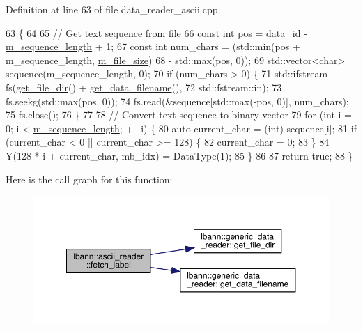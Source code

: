 Definition at line 63 of file data\+\_\+reader\+\_\+ascii.\+cpp.


\begin{DoxyCode}
63                                                                        \{
64 
65   \textcolor{comment}{// Get text sequence from file}
66   \textcolor{keyword}{const} \textcolor{keywordtype}{int} pos = data\_id - \hyperlink{classlbann_1_1ascii__reader_a5788fa7418a086de968929d0d4cb4fa4}{m\_sequence\_length} + 1;
67   \textcolor{keyword}{const} \textcolor{keywordtype}{int} num\_chars = (std::min(pos + m\_sequence\_length, \hyperlink{classlbann_1_1ascii__reader_af684694c8c7faef296bf5af2530471f3}{m\_file\_size})
68                          - std::max(pos, 0));
69   std::vector<char> sequence(m\_sequence\_length, 0);
70   \textcolor{keywordflow}{if} (num\_chars > 0) \{
71     std::ifstream fs(\hyperlink{classlbann_1_1generic__data__reader_ab4c6c2d4ba40ece809ce896828c8ff03}{get\_file\_dir}() + \hyperlink{classlbann_1_1generic__data__reader_a56664e1b43f3fe923cf6d652f14b40a9}{get\_data\_filename}(),
72                      std::fstream::in);
73     fs.seekg(std::max(pos, 0));
74     fs.read(&sequence[std::max(-pos, 0)], num\_chars);
75     fs.close();
76   \}
77 
78   \textcolor{comment}{// Convert text sequence to binary vector}
79   \textcolor{keywordflow}{for} (\textcolor{keywordtype}{int} i = 0; i < \hyperlink{classlbann_1_1ascii__reader_a5788fa7418a086de968929d0d4cb4fa4}{m\_sequence\_length}; ++i) \{
80     \textcolor{keyword}{auto} current\_char = (int) sequence[i];
81     \textcolor{keywordflow}{if} (current\_char < 0 || current\_char >= 128) \{
82       current\_char = 0;
83     \}
84     Y(128 * i + current\_char, mb\_idx) = DataType(1);
85   \}
86 
87   \textcolor{keywordflow}{return} \textcolor{keyword}{true};
88 \}
\end{DoxyCode}
Here is the call graph for this function\+:\nopagebreak
\begin{figure}[H]
\begin{center}
\leavevmode
\includegraphics[width=350pt]{classlbann_1_1ascii__reader_a361f883c71236c37dd2bc2dda5f00ef3_cgraph}
\end{center}
\end{figure}
